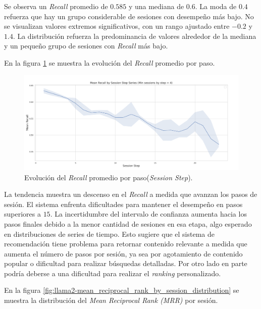 \documentclass[11pt,a4paper,twoside]{thesis}
\begin{document}
Se observa un \textit{Recall} promedio de $0.585$ y una mediana de $0.6$. La moda de $0.4$ refuerza que hay un grupo considerable de sesiones con desempeño más bajo. No se visualizan valores extremos significativos, con un rango ajustado entre $-0.2$ y $1.4$. La distribución refuerza la predominancia de valores alrededor de la mediana y un pequeño grupo de sesiones con \textit{Recall} más bajo.

En la figura \ref{fig:llama2-mean_recall_by_session_step_series} se muestra la evolución del \textit{Recall} promedio por paso.


\begin{figure}[htbp]
	\centering
	\includegraphics[width=15cm]{./images/llama2/mean_recall_by_session_step_series.png}
	\caption{Evolución del \textit{Recall} promedio por paso(\textit{Session Step}).}
	\label{fig:llama2-mean_recall_by_session_step_series}
\end{figure}

La tendencia muestra un descenso en el \textit{Recall} a medida que avanzan los pasos de sesión. El sistema enfrenta dificultades para mantener el desempeño en pasos superiores a $15$.
La incertidumbre del intervalo de confianza aumenta hacia los pasos finales debido a la menor cantidad de sesiones en esa etapa, algo esperado en distribuciones de series de tiempo. Esto sugiere que el sistema de recomendación tiene problema para retornar contenido relevante a medida que aumenta el número de pasos por sesión, ya sea por agotamiento de contenido popular o dificultad para realizar búsquedas detalladas. Por otro lado en parte podría deberse a una dificultad para realizar el \textit{ranking} personalizado.

En la figura \ref{fig:llama2-mean_reciprocal_rank_by_session_distribution} se muestra la distribución del \textit{Mean Reciprocal Rank (MRR)} por sesión.
\end{document}
